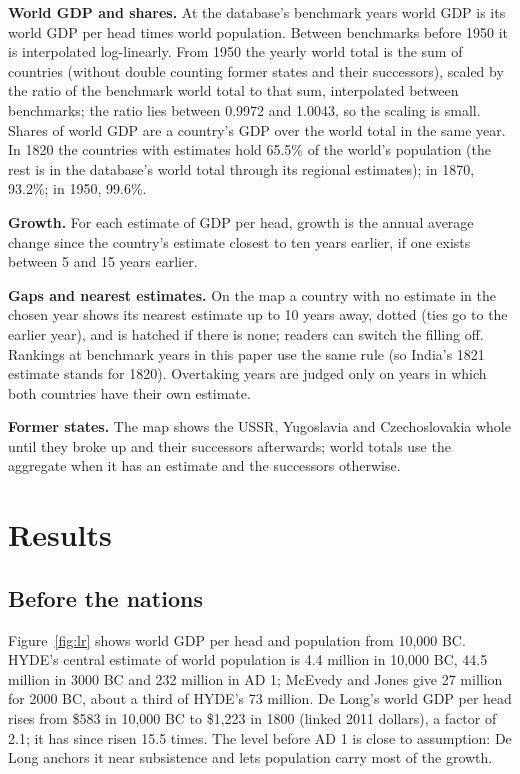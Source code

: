 \documentclass[11pt,a4paper]{article}
\begin{document}
\textbf{World GDP and shares.} At the database's benchmark years world GDP is its world GDP per head times world population. Between benchmarks before 1950 it is interpolated log-linearly. From 1950 the yearly world total is the sum of countries (without double counting former states and their successors), scaled by the ratio of the benchmark world total to that sum, interpolated between benchmarks; the ratio lies between 0.9972 and 1.0043, so the scaling is small. Shares of world GDP are a country's GDP over the world total in the same year. In 1820 the countries with estimates hold 65.5\% of the world's population (the rest is in the database's world total through its regional estimates); in 1870, 93.2\%; in 1950, 99.6\%.

\textbf{Growth.} For each estimate of GDP per head, growth is the annual average change since the country's estimate closest to ten years earlier, if one exists between 5 and 15 years earlier.

\textbf{Gaps and nearest estimates.} On the map a country with no estimate in the chosen year shows its nearest estimate up to 10 years away, dotted (ties go to the earlier year), and is hatched if there is none; readers can switch the filling off. Rankings at benchmark years in this paper use the same rule (so India's 1821 estimate stands for 1820). Overtaking years are judged only on years in which both countries have their own estimate.

\textbf{Former states.} The map shows the USSR, Yugoslavia and Czechoslovakia whole until they broke up and their successors afterwards; world totals use the aggregate when it has an estimate and the successors otherwise.

\section{Results}\label{sec:results}
\subsection{Before the nations}
Figure~\ref{fig:lr} shows world GDP per head and population from 10,000 BC. HYDE's central estimate of world population is 4.4 million in 10,000 BC, 44.5 million in 3000 BC and 232 million in AD 1; McEvedy and Jones give 27 million for 2000 BC, about a third of HYDE's 73 million. De Long's world GDP per head rises from \$583 in 10,000 BC to \$1,223 in 1800 (linked 2011 dollars), a factor of 2.1; it has since risen 15.5 times. The level before AD 1 is close to assumption: De Long anchors it near subsistence and lets population carry most of the growth.
\end{document}
